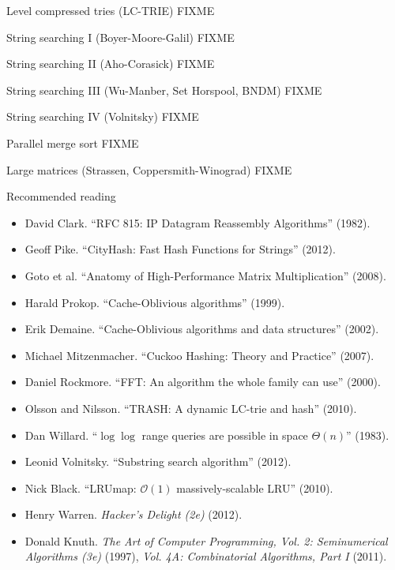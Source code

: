 \documentclass[mathserif,xcolor={dvipsnames,table}]{beamer}
\begin{document}
\begin{frame}{Level compressed tries (LC-TRIE)}
\huge FIXME
\end{frame}

\begin{frame}{String searching I (Boyer-Moore-Galil)}
\huge FIXME
\end{frame}

\begin{frame}{String searching II (Aho-Corasick)}
\huge FIXME
\end{frame}

\begin{frame}{String searching III (Wu-Manber, Set Horspool, BNDM)}
\huge FIXME
\end{frame}

\begin{frame}{String searching IV (Volnitsky)}
\huge FIXME
\end{frame}

\begin{frame}{Parallel merge sort}
\huge FIXME
\end{frame}

\begin{frame}{Large matrices (Strassen, Coppersmith-Winograd)}
\huge FIXME
\end{frame}

\begin{frame}{Recommended reading}
\footnotesize{
\begin{itemize}
\item David Clark. ``RFC 815: IP Datagram Reassembly Algorithms'' (1982).
\item Geoff Pike. ``CityHash: Fast Hash Functions for Strings'' (2012).
\item Goto et al. ``Anatomy of High-Performance Matrix Multiplication'' (2008).
\item Harald Prokop. ``Cache-Oblivious algorithms'' (1999).
\item Erik Demaine. ``Cache-Oblivious algorithms and data structures'' (2002).
\item Michael Mitzenmacher. ``Cuckoo Hashing: Theory and Practice'' (2007).
\item Daniel Rockmore. ``FFT: An algorithm the whole family can use'' (2000).
\item Olsson and Nilsson. ``TRASH: A dynamic LC-trie and hash'' (2010).
\item Dan Willard. ``$\log\log$ range queries are possible in space $\Theta(n)$'' (1983).
\item Leonid Volnitsky. ``Substring search algorithm'' (2012).
\item Nick Black. ``LRUmap: $\mathcal{O}(1)$ massively-scalable LRU'' (2010).
\item Henry Warren. \textit{Hacker's Delight (2e)} (2012).
\item Donald Knuth. \textit{The Art of Computer Programming, Vol. 2: Seminumerical Algorithms (3e)} (1997),
\textit{Vol. 4A: Combinatorial Algorithms, Part I} (2011).
\end{itemize}
}
\end{frame}
\end{document}

